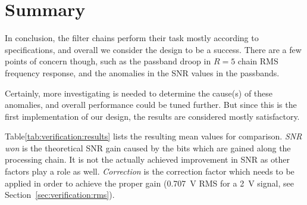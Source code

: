 \section{Summary} %
\label{sec:verification:summary}

In  conclusion, the  filter  chains  perform their  task  mostly according  to
specifications, and overall we consider the  design to be a success. There are
a few points of concern though, such  as the passband droop in $R=5$ chain RMS
frequency response, and the anomalies in the SNR values in the passbands.

Certainly, more  investigating is  needed to determine  the cause(s)  of these
anomalies, and overall  performance could be tuned further. But  since this is
the  first implementation  of our  design, the  results are  considered mostly
satisfactory.

Table\ref{tab:verification:results}  lists  the   resulting  mean  values  for
comparison. \emph{SNR  won} is  the theoretical  SNR gain  caused by  the bits
which are gained  along the processing chain. It is not  the actually achieved
improvement in SNR as other factors  play a role as well. \emph{Correction} is
the  correction factor  which needs  to  be applied  in order  to achieve  the
proper gain  (\SI{0.707}{\volt} RMS  for a \SI{2}{\V_}  signal, see
Section~\ref{sec:verification:rms}).

